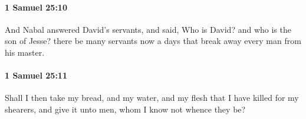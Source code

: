 		\paragraph{1 Samuel 25:10} %
			\label{1SAMUEL-25-10}

			And Nabal answered David’s servants, and said, Who is David? and who is the son of Jesse? there be many servants now a days that break away every man from his master.


		\paragraph{1 Samuel 25:11} %
			\label{1SAMUEL-25-11}

			Shall I then take my bread, and my water, and my flesh that I have killed for my shearers, and give it unto men, whom I know not whence they be?



